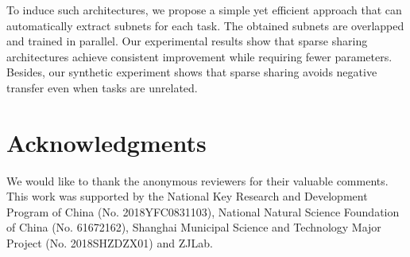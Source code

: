 \documentclass[letterpaper]{article} %
\begin{document}
To induce such architectures, we propose a simple yet efficient approach that can automatically extract subnets for each task. The obtained subnets are overlapped and trained in parallel. Our experimental results show that sparse sharing architectures achieve consistent improvement while requiring fewer parameters. Besides, our synthetic experiment shows that sparse sharing avoids negative transfer even when tasks are unrelated.

\section{Acknowledgments}
We would like to thank the anonymous reviewers for their valuable comments. This work was supported by the National Key Research and Development Program of China (No. 2018YFC0831103), National Natural Science Foundation of China (No. 61672162), Shanghai Municipal Science and Technology Major Project (No. 2018SHZDZX01) and ZJLab.



\end{document}
